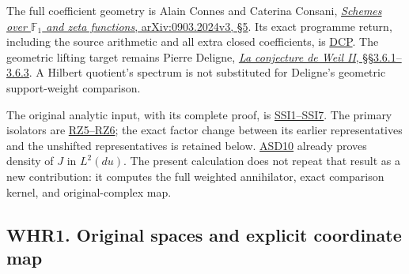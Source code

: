 The full coefficient geometry is Alain Connes and Caterina Consani,
\href{https://arxiv.org/abs/0903.2024v3}{\emph{Schemes over
\(\mathbb F_1\) and zeta functions}, arXiv:0903.2024v3, §5}. Its exact
programme return, including the source arithmetic and all extra closed
coefficients, is
\href{https://github.com/KokunoYumeto/zeta-function-research-reader/blob/36a82ecca98addb8a98b48204e349737856c7223/workbenches/splitzero-tandem/continuations/20260924-cohomology-weight-and-character-lifts/original-character-lifting/tau_lifting_weights_20260924/SOURCE_CC_DOUBLE_PULLBACK.md}{DCP}.
The geometric lifting target remains Pierre Deligne,
\href{https://www.numdam.org/item/PMIHES_1980__52__137_0/}{\emph{La
conjecture de Weil II}, §§3.6.1--3.6.3}. A Hilbert quotient's spectrum
is not substituted for Deligne's geometric support-weight comparison.

The original analytic input, with its complete proof, is
\href{https://github.com/KokunoYumeto/zeta-function-research-reader/blob/36a82ecca98addb8a98b48204e349737856c7223/workbenches/splitzero-tandem/continuations/20260924-cohomology-weight-and-character-lifts/geometric-positive-quotient/EXACT_SCHWARTZ_SUMMATION_IMAGE.md}{SSI1--SSI7}.
The primary isolators are
\href{https://github.com/KokunoYumeto/zeta-function-research-reader/blob/36a82ecca98addb8a98b48204e349737856c7223/workbenches/splitzero-tandem/continuations/20260924-cohomology-weight-and-character-lifts/gct-weight-control/proofs/ORIGINAL_ZETA_RESOLVENT_AND_PROJECTORS.md}{RZ5--RZ6};
the exact factor change between its earlier representatives and the
unshifted representatives is retained below.
\href{https://github.com/KokunoYumeto/zeta-function-research-reader/blob/36a82ecca98addb8a98b48204e349737856c7223/workbenches/splitzero-tandem/continuations/20260924-cohomology-weight-and-character-lifts/original-character-lifting/tau_lifting_weights_20260924/ACTUAL_SUPPORTED_DUALITY_INDEPENDENT.md}{ASD10}
already proves density of \(J\) in \(L^2(du)\). The present calculation
does not repeat that result as a new contribution: it computes the full
weighted annihilator, exact comparison kernel, and original-complex map.

\subsection{WHR1. Original spaces and explicit coordinate
map}\label{whr1.-original-spaces-and-explicit-coordinate-map}

